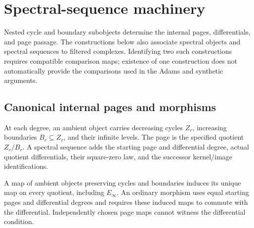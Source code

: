 \section{Spectral-sequence machinery}
\label{chap:spectral-sequence-machinery}

Nested cycle and boundary subobjects determine the internal pages,
differentials, and page passage. The constructions below also associate
spectral objects and spectral sequences to filtered complexes. Identifying
two such constructions requires compatible comparison maps; existence of
one construction does not automatically provide the comparisons used in
the Adams and synthetic arguments.

\subsection{Canonical internal pages and morphisms}

\begin{definition}
  \label{def:internal-nested-spectral-sequence}
  \leanok
  At each degree, an ambient object carries decreasing cycles $Z_r$,
  increasing boundaries $B_r\subseteq Z_r$, and their infinite levels.
  The page is the specified quotient $Z_r/B_r$. A spectral sequence adds
  the starting page and differential degree, actual quotient differentials,
  their square-zero law, and the successor kernel/image identifications.
\end{definition}

\begin{definition}
  \label{def:internal-canonical-page-map}
  \leanok
  A map of ambient objects preserving cycles and boundaries induces its
  unique map on every quotient, including $E_\infty$. An ordinary morphism
  uses equal starting pages and differential degrees and requires these
  induced maps to commute with the differential. Independently chosen page
  maps cannot witness the differential condition.
\end{definition}

